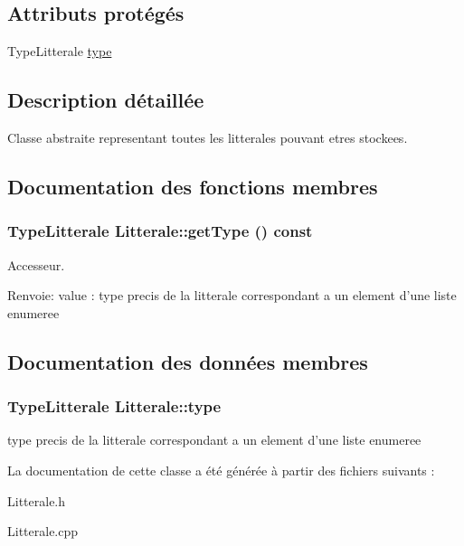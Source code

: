 \subsection*{Attributs protégés}
\begin{CompactItemize}
\item 
TypeLitterale \hyperlink{class_litterale_ab5099a9b2acefce3bc3da9487e0ad78}{type}
\end{CompactItemize}


\subsection{Description détaillée}
Classe abstraite representant toutes les litterales pouvant etres stockees. 

\subsection{Documentation des fonctions membres}
\hypertarget{class_litterale_a974ab68a06e8a8b15d04ecd4ce8065a}{
\subsubsection[{getType}]{\setlength{\rightskip}{0pt plus 5cm}TypeLitterale Litterale::getType () const}}
\label{class_litterale_a974ab68a06e8a8b15d04ecd4ce8065a}


Accesseur. 

\begin{Desc}
\item[Renvoie:]value : type precis de la litterale correspondant a un element d'une liste enumeree \end{Desc}


\subsection{Documentation des données membres}
\hypertarget{class_litterale_ab5099a9b2acefce3bc3da9487e0ad78}{
\subsubsection[{type}]{\setlength{\rightskip}{0pt plus 5cm}TypeLitterale {\bf Litterale::type}}}
\label{class_litterale_ab5099a9b2acefce3bc3da9487e0ad78}


type precis de la litterale correspondant a un element d'une liste enumeree 

La documentation de cette classe a été générée à partir des fichiers suivants :\begin{CompactItemize}
\item 
Litterale.h\item 
Litterale.cpp\end{CompactItemize}
